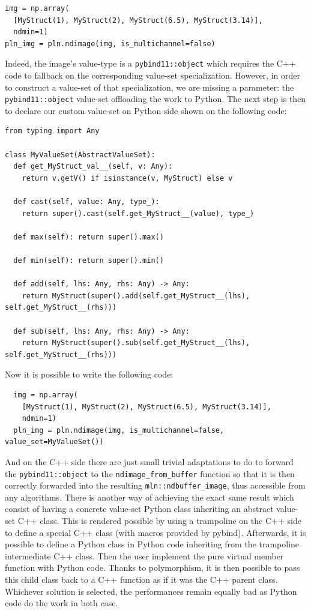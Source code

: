 \begin{verbatim}
img = np.array(
  [MyStruct(1), MyStruct(2), MyStruct(6.5), MyStruct(3.14)],
  ndmin=1)
pln_img = pln.ndimage(img, is_multichannel=false)
\end{verbatim}

Indeed, the image's value-type is a \texttt{pybind11::object} which requires the C++ code to fallback on the
corresponding value-set specialization. However, in order to construct a value-set of that specialization, we are
missing a parameter: the \texttt{pybind11::object} value-set offloading the work to Python. The next step is then to
declare our custom value-set on Python side shown on the following code:

\begin{verbatim}
from typing import Any

class MyValueSet(AbstractValueSet):
  def get_MyStruct_val__(self, v: Any):
    return v.getV() if isinstance(v, MyStruct) else v

  def cast(self, value: Any, type_):
    return super().cast(self.get_MyStruct__(value), type_)

  def max(self): return super().max()

  def min(self): return super().min()

  def add(self, lhs: Any, rhs: Any) -> Any:
    return MyStruct(super().add(self.get_MyStruct__(lhs), self.get_MyStruct__(rhs)))

  def sub(self, lhs: Any, rhs: Any) -> Any:
    return MyStruct(super().sub(self.get_MyStruct__(lhs), self.get_MyStruct__(rhs)))
\end{verbatim}

Now it is possible to write the following code:
\begin{verbatim}
  img = np.array(
    [MyStruct(1), MyStruct(2), MyStruct(6.5), MyStruct(3.14)],
    ndmin=1)
  pln_img = pln.ndimage(img, is_multichannel=false, value_set=MyValueSet())
\end{verbatim}

And on the C++ side there are just small trivial adaptations to do to forward the \texttt{pybind11::object} to the
\texttt{ndimage\_from\_buffer} function so that it is then correctly forwarded into the resulting
\texttt{mln::ndbuffer\_image}, thus accessible from any algorithms. There is another way of achieving the exact same
result which consist of having a concrete value-set Python class inheriting an abstract value-set C++ class. This is
rendered possible by using a trampoline on the C++ side to define a special C++ class (with macros provided by pybind).
Afterwards, it is possible to define a Python class in Python code inheriting from the trampoline intermediate C++
class. Then the user implement the pure virtual member function with Python code. Thanks to polymorphism, it is then
possible to pass this child class back to a C++ function as if it was the C++ parent class. Whichever solution is
selected, the performances remain equally bad as Python code do the work in both case.


